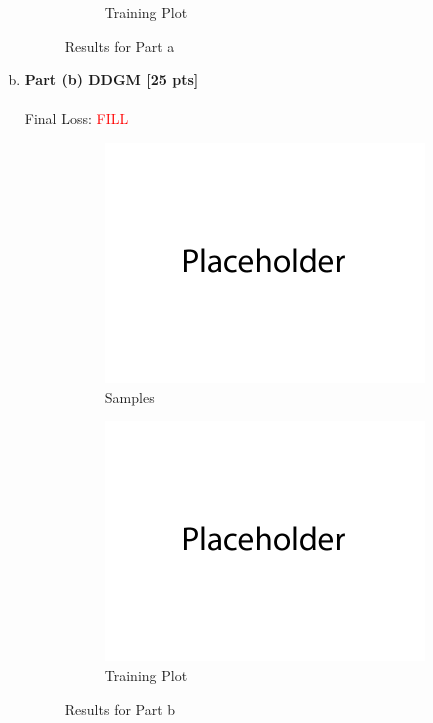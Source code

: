 \documentclass{article}
\begin{document}
\begin{enumerate}[(a)]
\begin{figure}[H]
\begin{subfigure}[b]{0.475\textwidth}
             \caption{Training Plot}
         \end{subfigure}
         \caption{Results for Part a}
     \end{figure}

\item {\bf Part (b) DDGM [25 pts] } \\\\
Final Loss: \textcolor{red}{FILL}
\begin{figure}[H]
         \centering
         \begin{subfigure}[b]{0.475\textwidth}
             \centering
             \includegraphics[width=\textwidth]{figures/q3_b_samples.png}
             \caption{Samples}
         \end{subfigure}
         \hfill
         \begin{subfigure}[b]{0.475\textwidth}
             \centering
             \includegraphics[width=\textwidth]{figures/q3_b_train_plot.png}
             \caption{Training Plot}
         \end{subfigure}
         \caption{Results for Part b}
     \end{figure}
\end{enumerate}
\end{document}
